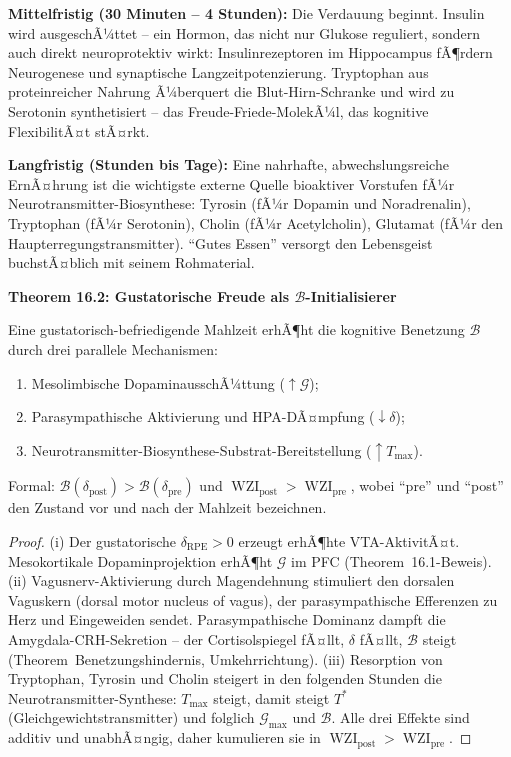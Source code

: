 ﻿\documentclass[12pt,a4paper]{report}
\theoremstyle{plain}
\theoremstyle{definition}
\theoremstyle{remark}
\DeclareMathOperator{\WZI}{WZI}
\begin{document}
	\textbf{Mittelfristig (30 Minuten -- 4 Stunden):}
	Die Verdauung beginnt. Insulin wird ausgeschÃ¼ttet -- ein Hormon,
	das nicht nur Glukose reguliert, sondern auch direkt
	neuroprotektiv wirkt: Insulinrezeptoren im Hippocampus
	fÃ¶rdern Neurogenese und synaptische Langzeitpotenzierung.
	Tryptophan aus proteinreicher Nahrung Ã¼berquert die
	Blut-Hirn-Schranke und wird zu Serotonin synthetisiert --
	das Freude-Friede-MolekÃ¼l, das kognitive FlexibilitÃ¤t stÃ¤rkt.

	\textbf{Langfristig (Stunden bis Tage):}
	Eine nahrhafte, abwechslungsreiche ErnÃ¤hrung ist die wichtigste
	externe Quelle bioaktiver Vorstufen fÃ¼r Neurotransmitter-Biosynthese:
	Tyrosin (fÃ¼r Dopamin und Noradrenalin), Tryptophan (fÃ¼r Serotonin),
	Cholin (fÃ¼r Acetylcholin), Glutamat (fÃ¼r den Haupterregungstransmitter).
	``Gutes Essen'' versorgt den Lebensgeist buchstÃ¤blich mit seinem
	Rohmaterial.

	
	\noindent\textbf{Theorem 16.2: Gustatorische Freude als $\mathcal{B}$-Initialisierer}

		Eine gustatorisch-befriedigende Mahlzeit erhÃ¶ht die kognitive
		Benetzung $\mathcal{B}$ durch drei parallele Mechanismen:
		\begin{enumerate}[label=(\roman*), leftmargin=1.8cm, topsep=2pt]
			\item Mesolimbische DopaminausschÃ¼ttung ($\uparrow \mathcal{G}$);
			\item Parasympathische Aktivierung und HPA-DÃ¤mpfung ($\downarrow \delta$);
			\item Neurotransmitter-Biosynthese-Substrat-Bereitstellung ($\uparrow T_{\max}$).
		\end{enumerate}
		Formal: $\mathcal{B}(\delta_{\mathrm{post}}) > \mathcal{B}(\delta_{\mathrm{pre}})$
		und $\WZI_{\mathrm{post}} > \WZI_{\mathrm{pre}}$, wobei ``pre'' und ``post''
		den Zustand vor und nach der Mahlzeit bezeichnen.


	\begin{proof}
		(i) Der gustatorische $\delta_{\mathrm{RPE}} > 0$ erzeugt erhÃ¶hte VTA-AktivitÃ¤t.
		Mesokortikale Dopaminprojektion erhÃ¶ht $\mathcal{G}$ im PFC (Theorem~16.1-Beweis).
		(ii) Vagusnerv-Aktivierung durch Magendehnung stimuliert den dorsalen
		Vaguskern (dorsal motor nucleus of vagus), der para\-sympathische
		Efferenzen zu Herz und Eingeweiden sendet. Parasympathische Dominanz
		dampft die Amygdala-CRH-Sekretion -- der Cortisolspiegel fÃ¤llt,
		$\delta$ fÃ¤llt, $\mathcal{B}$ steigt (Theorem~Benetzungshindernis, Umkehrrichtung).
		(iii) Resorption von Tryptophan, Tyrosin und Cholin steigert
		in den folgenden Stunden die Neurotransmitter-Synthese:
		$T_{\max}$ steigt, damit steigt $T^*$ (Gleichgewichtstransmitter) und
		folglich $\mathcal{G}_{\max}$ und $\mathcal{B}$.
		Alle drei Effekte sind additiv und unabhÃ¤ngig,
		daher kumulieren sie in $\WZI_{\mathrm{post}} > \WZI_{\mathrm{pre}}$. \hfill
	\end{proof}
\end{document}
